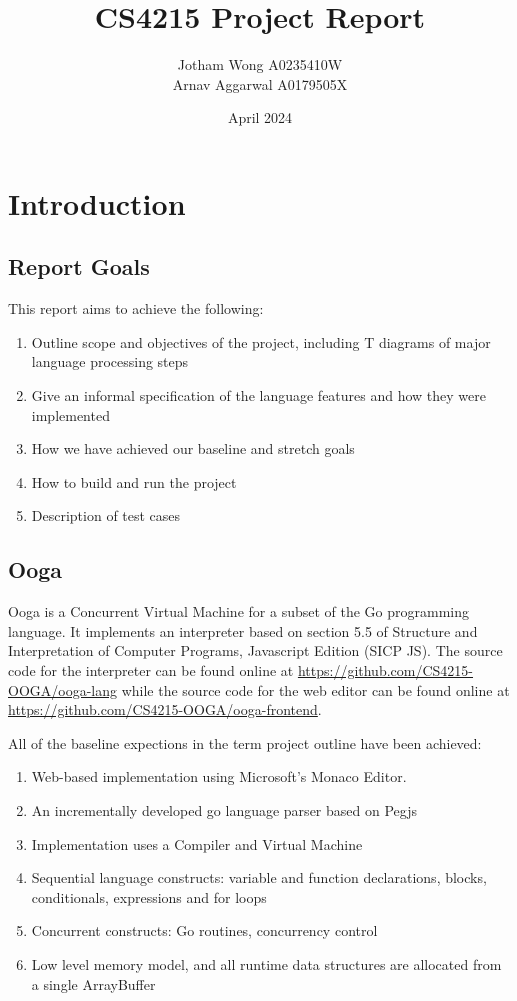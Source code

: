 \documentclass{report}
\title{CS4215 Project Report}
\author{Jotham Wong A0235410W\\Arnav Aggarwal A0179505X}
\date{April 2024}
\begin{document}
\graphicspath{{./images}}

\maketitle
\tableofcontents
\newpage

\section{Introduction}

\subsection{Report Goals}

This report aims to achieve the following:

\begin{enumerate}
    \item Outline scope and objectives of the project, including T diagrams of major language processing steps
    \item Give an informal specification of the language features and how they were implemented
    \item How we have achieved our baseline and stretch goals
    \item How to build and run the project
    \item Description of test cases
\end{enumerate}

\subsection{Ooga}

Ooga is a Concurrent Virtual Machine for a subset of the Go programming language. It implements an interpreter based on section 5.5 of Structure and Interpretation of Computer Programs, Javascript Edition (SICP JS). The source code for the interpreter can be found online at \url{https://github.com/CS4215-OOGA/ooga-lang} while the source code for the web editor can be found online at \url{https://github.com/CS4215-OOGA/ooga-frontend}.

All of the baseline expections in the term project outline have been achieved:

\begin{enumerate}
    \item Web-based implementation using Microsoft's Monaco Editor.
    \item An incrementally developed go language parser based on Pegjs
    \item Implementation uses a Compiler and Virtual Machine
    \item Sequential language constructs: variable and function declarations, blocks, conditionals, expressions and for loops
    \item Concurrent constructs: Go routines, concurrency control
    \item Low level memory model, and all runtime data structures are allocated from a single ArrayBuffer
\end{enumerate}
\end{document}
